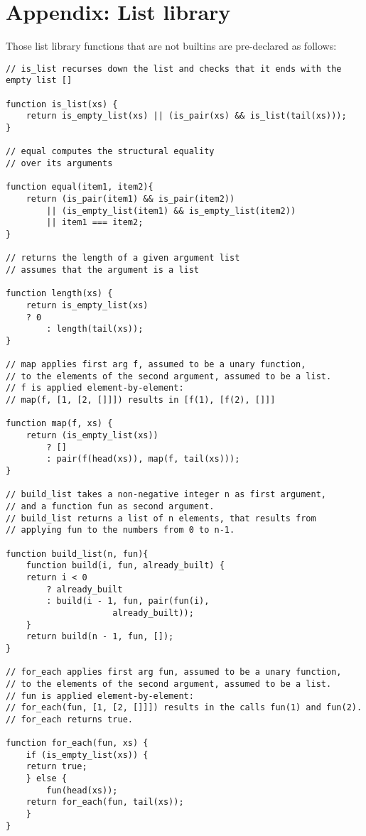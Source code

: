 \section*{Appendix: List library}

Those list library functions that are not builtins are pre-declared as follows:

\begin{lstlisting}
// is_list recurses down the list and checks that it ends with the empty list []

function is_list(xs) {
    return is_empty_list(xs) || (is_pair(xs) && is_list(tail(xs)));
}

// equal computes the structural equality 
// over its arguments

function equal(item1, item2){
    return (is_pair(item1) && is_pair(item2))
        || (is_empty_list(item1) && is_empty_list(item2))
        || item1 === item2;
}

// returns the length of a given argument list
// assumes that the argument is a list

function length(xs) {
    return is_empty_list(xs) 
	? 0
        : length(tail(xs));
}

// map applies first arg f, assumed to be a unary function,
// to the elements of the second argument, assumed to be a list.
// f is applied element-by-element: 
// map(f, [1, [2, []]]) results in [f(1), [f(2), []]]

function map(f, xs) {
    return (is_empty_list(xs)) 
        ? []
        : pair(f(head(xs)), map(f, tail(xs)));
}

// build_list takes a non-negative integer n as first argument,
// and a function fun as second argument.
// build_list returns a list of n elements, that results from 
// applying fun to the numbers from 0 to n-1.

function build_list(n, fun){
    function build(i, fun, already_built) {
	return i < 0
	    ? already_built
	    : build(i - 1, fun, pair(fun(i),
		  		     already_built));
    }
    return build(n - 1, fun, []);
}

// for_each applies first arg fun, assumed to be a unary function,
// to the elements of the second argument, assumed to be a list.
// fun is applied element-by-element:
// for_each(fun, [1, [2, []]]) results in the calls fun(1) and fun(2).
// for_each returns true.

function for_each(fun, xs) {
    if (is_empty_list(xs)) {
	return true;
    } else {
        fun(head(xs));
	return for_each(fun, tail(xs));
    }
}


\end{lstlisting}
